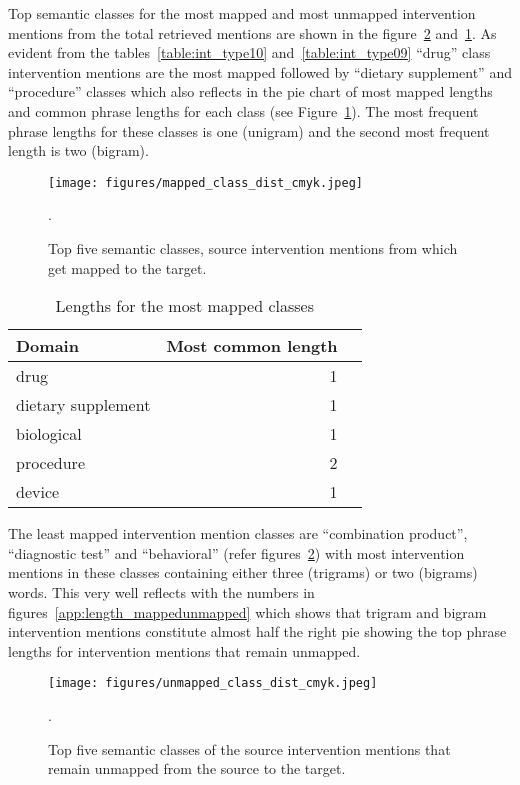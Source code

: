 \documentclass[letterpaper]{article} %
\begin{document}
Top semantic classes for the most mapped and most unmapped intervention mentions from the total retrieved mentions are shown in the figure~\ref{app:unmapped_class_dist} and~\ref{app:mapped_class_dist}.
As evident from the tables~\ref{table:int_type10} and~\ref{table:int_type09} ``drug'' class intervention mentions are the most mapped followed by ``dietary supplement'' and ``procedure'' classes which also reflects in the pie chart of most mapped lengths and common phrase lengths for each class (see Figure~\ref{app:mapped_class_dist}).
The most frequent phrase lengths for these classes is one (unigram) and the second most frequent length is two (bigram).
%
\begin{figure}[hbt!]
\centering
\texttt{[image: figures/mapped\_class\_dist\_cmyk.jpeg]}
\caption{Top five semantic classes, source intervention mentions from which get mapped to the target.}.
\label{app:mapped_class_dist}
\end{figure}
%
\begin{table}[!htbp]
\centering
\begin{tabular}{lrl}
\hline \textbf{Domain} & \textbf{ Most common length } \\ \hline
drug & 1 \\
dietary supplement & 1 \\
biological & 1 \\
procedure & 2 \\
device & 1 \\
\hline
\end{tabular}
\caption{Lengths for the most mapped classes}
\label{table:len_mapped_classes} 
\end{table}
%
%
The least mapped intervention mention classes are ``combination product'', ``diagnostic test'' and ``behavioral'' (refer figures~\ref{app:unmapped_class_dist}) with most intervention mentions in these classes containing either three (trigrams) or two (bigrams) words.
This very well reflects with the numbers in figures~\ref{app:length_mappedunmapped} which shows that trigram and bigram intervention mentions constitute almost half the right pie showing the top phrase lengths for intervention mentions that remain unmapped.
%
\begin{figure}[hbt!]
\centering
\texttt{[image: figures/unmapped\_class\_dist\_cmyk.jpeg]}
\caption{Top five semantic classes of the source intervention mentions that remain unmapped from the source to the target.}.
\label{app:unmapped_class_dist}
\end{figure}
\end{document}
